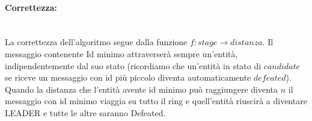 \paragraph{Correttezza:}\ \\
La correttezza dell'algoritmo segue dalla funzione $f: stage \longrightarrow
    distanza $. Il messaggio contenente Id minimo attraverserà sempre un'entità,
indipendentemente dal suo stato (ricordiamo che un'entità in stato di
$candidate$ se riceve un messaggio con id più piccolo diventa automaticamente
$defeated$). Quando la distanza che l'entità avente id minimo può raggiungere
diventa $n$ il messaggio con id minimo viaggia su tutto il ring e quell'entità
riuscirà a diventare LEADER e tutte le altre saranno Defeated.

